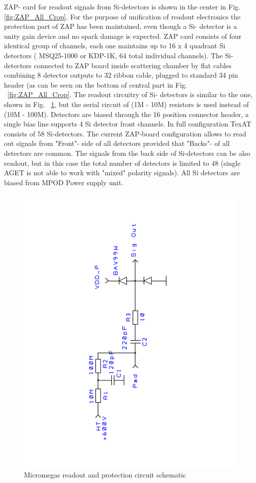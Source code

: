 \documentclass[final,number,sort&compress,5p,times,twocolumn]{elsarticle}
\begin{document}
ZAP- card for readout signals from Si-detectors is shown in the center  in Fig. \ref{fig:ZAP_All_Crop}. For the purpose of unification of readout electronics the protection part of ZAP has been maintained, even though a Si- detector is a unity gain device and no spark damage is expected. ZAP card  consists of four identical group of channels, each one maintains up to 16 x 4 quadrant Si detectors ( MSQ25-1000 or KDP-1K, 64 total individual channels). The  Si-detectors connected to ZAP board inside scattering chamber by flat cables combining 8 detector outputs to 32 ribbon cable,
plugged to standard 34 pin header (as can be seen on the bottom of central part in Fig. ~\ref{fig:ZAP_All_Crop}. 
The readout circuitry of Si- detectors is similar to the one, shown in Fig. ~\ref{fig:MMZAP_circuit}, but the serial circuit of  (1M - 10M) resistors 
is used instead of (10M - 100M). Detectors are biased through the 16 position connector header, a single bias line supports 4 Si detector front channels.
In full configuration TexAT consists of 58 Si-detectors. The current ZAP-board configuration allows to read out signals from "Front"- side  of all detectors
provided that "Backs"- of all detectors are common. The signals from the back side of Si-detectors can be also readout, but in this case 
the total number of detectors is limited to 48 (single AGET is not able to work with "mixed" polarity signals).  All Si detectors are biased from MPOD Power supply unit. 


\begin{figure}[hbt!]
    \centering
     \includegraphics[width=0.8\columnwidth, angle=270 ]{Figs/Micromegas_ZAP_Circuit.pdf}
    \caption{Micromegas readout and protection circuit schematic}
      \label{fig:MMZAP_circuit}
\end{figure}
\end{document}
